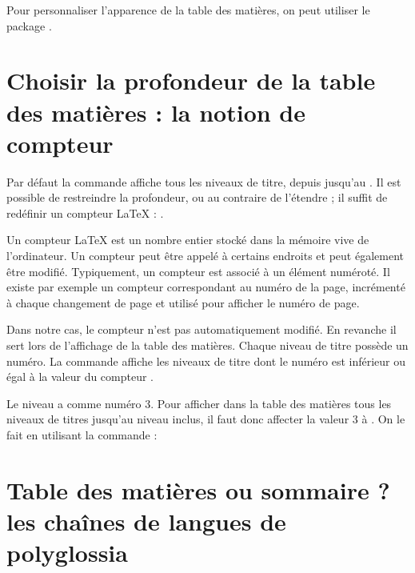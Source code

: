 \begin{plusloins}

Pour personnaliser l'apparence de la table des matières, on peut utiliser le package . 
\end{plusloins}

\section[Choix de la profondeur]{Choisir la profondeur de la table des matières : la notion de compteur}\label{tocdepth}

Par défaut la commande  affiche tous les niveaux de titre, depuis  jusqu'au . Il est possible de restreindre la profondeur, ou au contraire de l'étendre ; il suffit de redéfinir un compteur \LaTeX{} : .

Un compteur \LaTeX{} est un nombre entier stocké dans la mémoire vive de l'ordinateur. Un compteur peut être appelé à certains endroits et peut également être modifié. Typiquement, un compteur est associé à un élément numéroté. Il existe par exemple un compteur  correspondant au numéro de la page, incrémenté  à chaque changement de page et utilisé pour afficher le numéro de page.\label{compteur}

Dans notre cas, le compteur  n'est pas automatiquement modifié. En revanche il sert lors de l'affichage de la table des matières. Chaque niveau de titre possède un numéro. La commande  affiche les niveaux de titre dont le numéro est inférieur ou égal à la valeur du compteur .

Le niveau  a comme numéro 3. Pour afficher dans la table des matières tous les niveaux de titres jusqu'au niveau  inclus, il faut donc affecter la valeur 3 à  . On le fait en utilisant la commande  :

\begin{latexcode}
\setcounter{tocdepth}{3}
\tableofcontents
\end{latexcode}

\section[Table des matières ou sommaire ?]{Table des matières ou sommaire ? les chaînes de langues de polyglossia}

